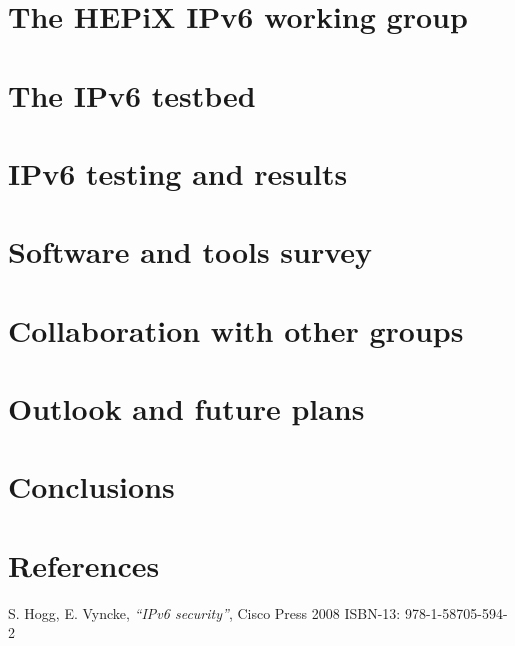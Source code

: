\documentclass[a4paper]{jpconf}
\begin{document}
\section{The HEPiX IPv6 working group}
%

\section{The IPv6 testbed}
%

\section{IPv6 testing and results}


\section{Software and tools survey}
%

\section{Collaboration with other groups}
%

\section{Outlook and future plans}
%

\section{Conclusions}
%

\par
\section*{References}

\begin{thebibliography}{1}
 S. Hogg, E. Vyncke,
    {\it ``IPv6 security''}, Cisco Press 2008 ISBN-13: 978-1-58705-594-2
\end{thebibliography}
\end{document}
